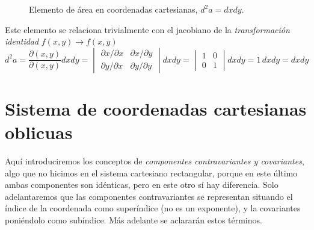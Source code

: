 \begin{figure}[ht]
  \caption{Elemento de área en coordenadas cartesianas, $d^2a = dx dy$.}
  \label{fig:R2-rect-elemento_area}
\end{figure}

Este elemento se relaciona trivialmente con el jacobiano de la
\emph{transformación identidad} $f(x,y) \longrightarrow f(x,y)$
\[
  d^2a = \dfrac{\partial(x,y)}{\partial(x,y)} dx dy
  = \begin{vmatrix}
    \partial x/\partial x & \partial x/\partial y\\
    \partial y/\partial x & \partial y/\partial y
  \end{vmatrix}
  dx dy
  = \begin{vmatrix}
    1 & 0\\
    0 & 1
  \end{vmatrix}
  dx dy
  = 1\,dx dy
  = dxdy
\]

\section{Sistema de coordenadas cartesianas oblicuas}
Aquí introduciremos los conceptos de \emph{componentes contravariantes y covariantes},
algo que no hicimos en el sistema cartesiano rectangular, porque en este último ambas
componentes son idénticas, pero en este otro sí hay diferencia.
Solo adelantaremos que las componentes contravariantes se representan situando el índice
de la coordenada como superíndice (no es un exponente), y la covariantes poniéndolo
como subíndice. Más adelante se aclararán estos términos.

